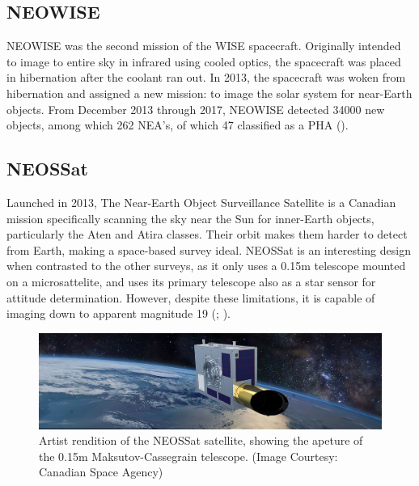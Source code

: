 \subsection{NEOWISE}
NEOWISE was the second mission of the WISE spacecraft. Originally intended to image to entire sky in infrared using cooled optics, the spacecraft was placed in hibernation after the coolant ran out. In 2013, the spacecraft was woken from hibernation and assigned a new mission: to image the solar system for near-Earth objects. From December 2013 through 2017, NEOWISE detected 34000 new objects, among which 262 NEA's, of which 47 classified as a PHA (\cite{NEOWise}).

\subsection{NEOSSat}
\label{ssec:NEOSSat}
Launched in 2013, The Near-Earth Object Surveillance Satellite is a Canadian mission specifically scanning the sky near the Sun for inner-Earth objects, particularly the Aten and Atira classes. Their orbit makes them harder to detect from Earth, making a space-based survey ideal. NEOSSat is an interesting design when contrasted to the other surveys, as it only uses a 0.15m telescope mounted on a microsattelite, and uses its primary telescope also as a star sensor for attitude determination. However, despite these limitations, it is capable of imaging down to apparent magnitude 19 (\cite{Neossat}; \cite{Neossattwo}). 

\begin{figure}[hbtp]
    \centering
    \includegraphics[width=1.0\textwidth]{images/neossat.jpg}
    \caption{Artist rendition of the NEOSSat satellite, showing the apeture of the 0.15m Maksutov-Cassegrain telescope. (Image Courtesy: Canadian Space Agency)}
    \label{fig:neossat}
\end{figure}